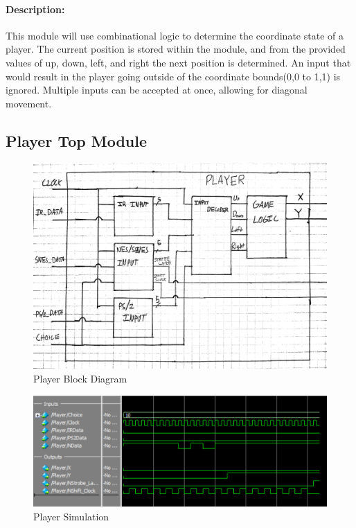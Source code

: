 \documentclass[]{article}
\begin{document}
\paragraph{Description:} This module will use combinational logic to determine the coordinate state of a player.
The current position is stored within the module, and from the provided values of up, down, left, and right the next position is determined.
An input that would result in the player going outside of the coordinate bounds(0,0 to 1,1) is ignored. Multiple inputs can be accepted at once, allowing for diagonal movement.

\subsection{Player Top Module}
\begin{figure}[H]\centering
    \includegraphics[width=\linewidth]{figures/Player_Block.jpg}
    \caption{Player Block Diagram}
    \label{fig:playerBlock}
\end{figure}
\begin{figure}[H]\centering
    \includegraphics[width=\linewidth]{figures/Player_Sim.png}
    \caption{Player Simulation}
    \label{fig:playerSim}
\end{figure}
\end{document}
